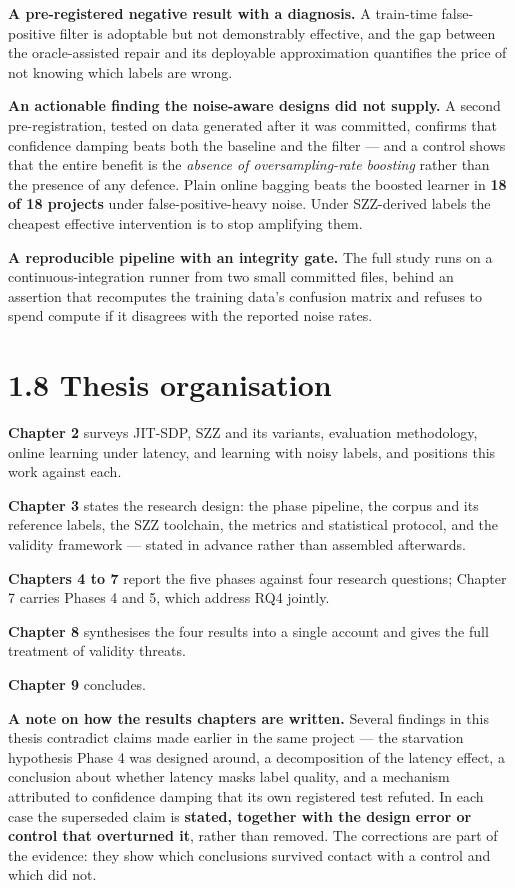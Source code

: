 \textbf{A pre-registered negative result with a diagnosis.} A train-time
false-positive filter is adoptable but not demonstrably effective, and
the gap between the oracle-assisted repair and its deployable
approximation quantifies the price of not knowing which labels are
wrong.

\textbf{An actionable finding the noise-aware designs did not supply.} A
second pre-registration, tested on data generated after it was
committed, confirms that confidence damping beats both the baseline and
the filter --- and a control shows that the entire benefit is the
\emph{absence of oversampling-rate boosting} rather than the presence of
any defence. Plain online bagging beats the boosted learner in
\textbf{18 of 18 projects} under false-positive-heavy noise. Under
SZZ-derived labels the cheapest effective intervention is to stop
amplifying them.

\textbf{A reproducible pipeline with an integrity gate.} The full study
runs on a continuous-integration runner from two small committed files,
behind an assertion that recomputes the training data's confusion matrix
and refuses to spend compute if it disagrees with the reported noise
rates.

\section{1.8 Thesis organisation}\label{thesis-organisation}

\textbf{Chapter 2} surveys JIT-SDP, SZZ and its variants, evaluation
methodology, online learning under latency, and learning with noisy
labels, and positions this work against each.

\textbf{Chapter 3} states the research design: the phase pipeline, the
corpus and its reference labels, the SZZ toolchain, the metrics and
statistical protocol, and the validity framework --- stated in advance
rather than assembled afterwards.

\textbf{Chapters 4 to 7} report the five phases against four research
questions; Chapter 7 carries Phases 4 and 5, which address RQ4 jointly.

\textbf{Chapter 8} synthesises the four results into a single account
and gives the full treatment of validity threats.

\textbf{Chapter 9} concludes.

\textbf{A note on how the results chapters are written.} Several
findings in this thesis contradict claims made earlier in the same
project --- the starvation hypothesis Phase 4 was designed around, a
decomposition of the latency effect, a conclusion about whether latency
masks label quality, and a mechanism attributed to confidence damping
that its own registered test refuted. In each case the superseded claim
is \textbf{stated, together with the design error or control that
overturned it}, rather than removed. The corrections are part of the
evidence: they show which conclusions survived contact with a control
and which did not.
